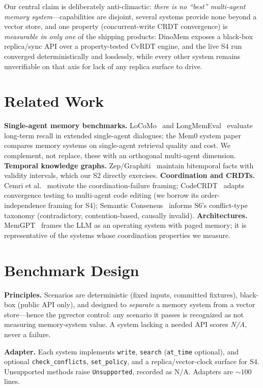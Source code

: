 \documentclass[11pt]{article}
\begin{document}
Our central claim is deliberately anti-climactic: \emph{there is no ``best''
multi-agent memory system}---capabilities are disjoint, several systems provide none
beyond a vector store, and one property (concurrent-write CRDT convergence) is
\emph{measurable in only one} of the shipping products: DinoMem exposes a black-box
replica/sync API over a property-tested CvRDT engine, and the live S4 run converged
deterministically and losslessly, while every other system remains unverifiable on
that axis for lack of any replica surface to drive.

\section{Related Work}
\textbf{Single-agent memory benchmarks.} LoCoMo~\cite{maharana2024locomo} and
LongMemEval~\cite{wu2025longmemeval} evaluate long-term recall in extended
single-agent dialogues; the Mem0 system paper~\cite{chhikara2025mem0} compares memory
systems on single-agent retrieval quality and cost. We complement, not replace, these
with an orthogonal multi-agent dimension. \textbf{Temporal knowledge graphs.}
Zep/Graphiti~\cite{rasmussen2025zep} maintain bitemporal facts with validity
intervals, which our S2 directly exercises. \textbf{Coordination and CRDTs.}
Cemri et al.~\cite{cemri2025mast} motivate the coordination-failure framing;
CodeCRDT~\cite{codecrdt2025} adapts convergence testing to multi-agent code editing
(we borrow its order-independence framing for S4); Semantic
Consensus~\cite{acharya2026semconsensus} informs S6's conflict-type taxonomy
(contradictory, contention-based, causally invalid). \textbf{Architectures.}
MemGPT~\cite{packer2023memgpt} frames the LLM as an operating system with paged
memory; it is representative of the systems whose coordination properties we measure.

\section{Benchmark Design}\label{sec:design}
\textbf{Principles.} Scenarios are deterministic (fixed inputs, committed fixtures),
black-box (public API only), and designed to \emph{separate} a memory system from a
vector store---hence the pgvector control: any scenario it passes is recognized as
not measuring memory-system value. A system lacking a needed API scores \emph{N/A},
never a failure.

\textbf{Adapter.} Each system implements \texttt{write}, \texttt{search}
(\texttt{at\_time} optional), and optional \texttt{check\_conflicts},
\texttt{set\_policy}, and a replica/vector-clock surface for S4. Unsupported methods
raise \texttt{Unsupported}, recorded as N/A. Adapters are ${\sim}100$ lines.
\end{document}
